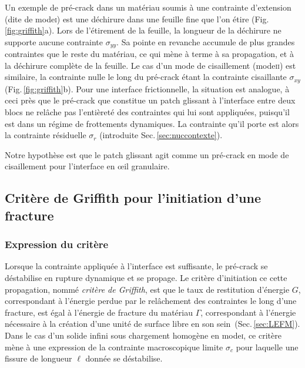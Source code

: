 Un exemple de pré-crack dans un matériau soumis à une contrainte d'extension (dite de mode\:\textsc{i}) est une déchirure dans une feuille fine que l'on étire (Fig.\,\ref{fig:griffith}a). Lors de l'étirement de la feuille, la longueur de la déchirure ne supporte aucune contrainte $\sigma_{yy}$. Sa pointe en revanche accumule de plus grandes contraintes que le reste du matériau, ce qui mène à terme à sa propagation, et à la déchirure complète de la feuille. Le cas d'un mode de cisaillement (mode\:\textsc{ii}) est similaire, la contrainte nulle le long du pré-crack étant la contrainte cisaillante $\sigma_{xy}$ (Fig.\,\ref{fig:griffith}b). Pour une interface frictionnelle, la situation est analogue, à ceci près que le pré-crack que constitue un patch glissant à l'interface entre deux blocs ne relâche pas l'entièreté des contraintes qui lui sont appliquées, puisqu'il est dans un régime de frottements dynamiques. La contrainte qu'il porte est alors la contrainte résiduelle $\sigma_r$ (introduite Sec.\,\ref{sec:nuccontexte}).

\pagebreak

Notre hypothèse est que le patch glissant agit comme un pré-crack en mode de cisaillement pour l'interface en œil granulaire.


\subsection{Critère de Griffith pour l'initiation d'une fracture}
\label{sec:griffith}


\subsubsection{Expression du critère}

Lorsque la contrainte appliquée à l'interface est suffisante, le pré-crack se déstabilise en rupture dynamique et se propage. Le critère d'initiation ce cette propagation, nommé \textit{critère de Griffith}, est que le taux de restitution d'énergie $G$, correspondant à l'énergie perdue par le relâchement des contraintes le long d'une fracture, est égal à l'énergie de fracture du matériau $\Gamma$, correspondant à l'énergie nécessaire à la création d'une unité de surface libre en son sein\,\cite{griffith_phenomena_1921,freund_dynamic_1990} (Sec.\,\ref{sec:LEFM}). Dans le cas d'un solide infini sous chargement homogène en mode\:\textsc{i}, ce critère mène à une expression de la contrainte macroscopique limite $\sigma_c$ pour laquelle une fissure de longueur $\ell$ donnée se déstabilise.

